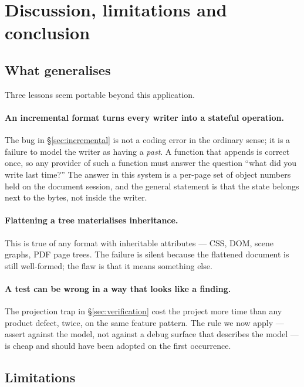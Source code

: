 \section{Discussion, limitations and conclusion}
\label{sec:discussion}

\subsection{What generalises}

Three lessons seem portable beyond this application.

\paragraph{An incremental format turns every writer into a stateful operation.} The bug in
\S\ref{sec:incremental} is not a coding error in the ordinary sense; it is a failure to model
the writer as having a \emph{past}. A function that appends is correct once, so any provider of
such a function must answer the question ``what did you write last time?'' The answer in this
system is a per-page set of object numbers held on the document session, and the general
statement is that the state belongs next to the bytes, not inside the writer.

\paragraph{Flattening a tree materialises inheritance.} This is true of any format with
inheritable attributes --- CSS, DOM, scene graphs, PDF page trees. The failure is silent
because the flattened document is still well-formed; the flaw is that it means something else.

\paragraph{A test can be wrong in a way that looks like a finding.} The projection trap in
\S\ref{sec:verification} cost the project more time than any product defect, twice, on the same
feature pattern. The rule we now apply --- assert against the model, not against a debug
surface that describes the model --- is cheap and should have been adopted on the first
occurrence.

\subsection{Limitations}
\label{sec:limits}

